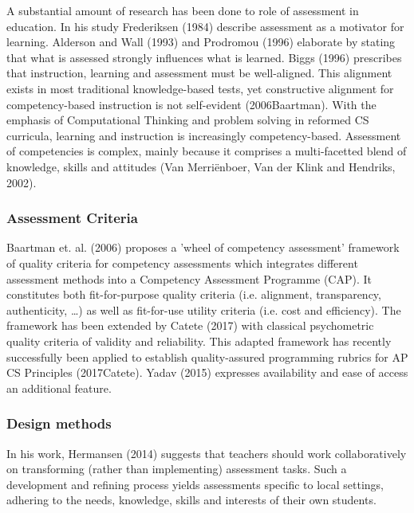 A substantial amount of research has been done to role of assessment in education. In his study Frederiksen (1984) describe assessment as a motivator for learning. Alderson and Wall (1993) and Prodromou (1996) elaborate by stating that what is assessed strongly influences what is learned. Biggs (1996) prescribes that instruction, learning and assessment must be well-aligned. This alignment exists in most traditional knowledge-based tests, yet constructive alignment for competency-based instruction is not self-evident (2006Baartman). With the emphasis of Computational Thinking and problem solving in reformed CS curricula, learning and instruction is increasingly competency-based. Assessment of competencies is complex, mainly because it comprises a multi-facetted blend of knowledge, skills and attitudes (Van Merriënboer, Van der Klink and Hendriks, 2002).

\subsubsection*{Assessment Criteria}\label{sec:qualityCriteria}
Baartman et. al. (2006) proposes a 'wheel of competency assessment' framework of quality criteria for competency assessments which integrates different assessment methods into a Competency Assessment Programme (CAP). It constitutes both fit-for-purpose quality criteria (i.e. alignment, transparency, authenticity, \ldots) as well as fit-for-use utility criteria (i.e. cost and efficiency). The framework has been extended by Catete (2017) with classical psychometric quality criteria of validity and reliability. This adapted framework has recently successfully been applied to establish quality-assured programming rubrics for AP CS Principles (2017Catete).
 Yadav (2015) expresses availability and ease of access an additional feature.




\subsubsection*{Design methods}

In his work, Hermansen (2014) suggests that teachers should work collaboratively on transforming (rather than implementing) assessment tasks. Such a development and refining process yields assessments specific to local settings, adhering to the needs, knowledge, skills and interests of their own students.

